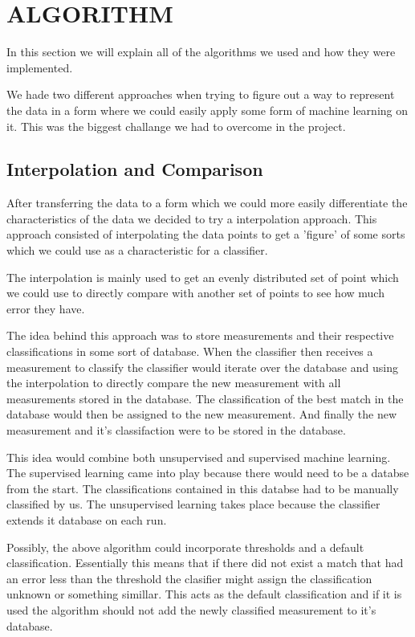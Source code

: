 \documentclass[a4paper, 10pt, conference]{ieeeconf}      %
\begin{document}
\section{ALGORITHM}
In this section we will explain all of the algorithms we used and how they were implemented. 

We hade two different approaches when trying to figure out a way to represent the data in a form where we could easily apply some form of machine learning on it. This was the biggest challange we had to overcome in the project. 

\subsection{Interpolation and Comparison}
After transferring the data to a form which we could more easily differentiate the characteristics of the data we decided to try a interpolation approach. This approach consisted of interpolating the data points to get a 'figure' of some sorts which we could use as a characteristic for a classifier.

The interpolation is mainly used to get an evenly distributed set of point which we could use to directly compare with another set of points to see how much error they have.

The idea behind this approach was to store measurements and their respective classifications in some sort of database. When the classifier then receives a measurement to classify the classifier would iterate over the database and using the interpolation to directly compare the new measurement with all measurements stored in the database. The classification of the best match in the database would then be assigned to the new measurement. And finally the new measurement and it's classifaction were to be stored in the database.

This idea would combine both unsupervised and supervised machine learning. The supervised learning came into play because there would need to be a databse from the start. The classifications contained in this databse had to be manually classified by us. The unsupervised learning takes place because the classifier extends it database on each run.

Possibly, the above algorithm could incorporate thresholds and a default classification. Essentially this means that if there did not exist a match that had an error less than the threshold the clasifier might assign the classification unknown or something simillar. This acts as the default classification and if it is used the algorithm should not add the newly classified measurement to it's database.
\end{document}
